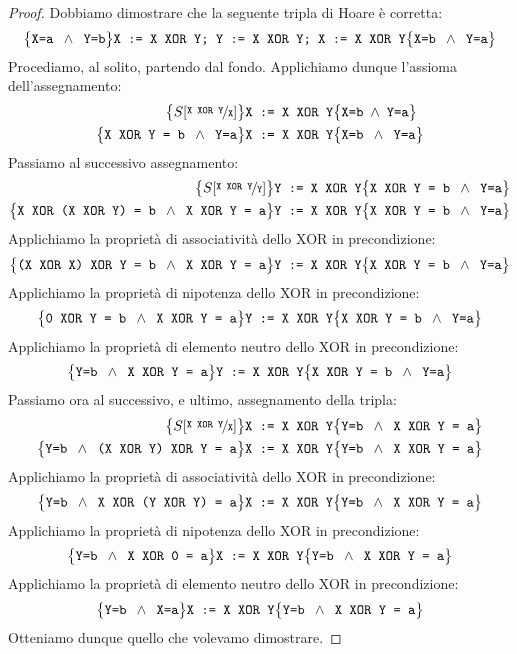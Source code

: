 \begin{proof}
Dobbiamo dimostrare che la seguente tripla di Hoare è corretta:
\[
  \bigl\{ \text{\texttt{X=a }} \land \text{\texttt{ Y=b}} \bigr\} 
  \text{\texttt{X := X XOR Y; Y := X XOR Y; X := X XOR Y}}
  \bigl\{\text{\texttt{X=b }} \land \text{\texttt{ Y=a}} \bigr\}
\]
Procediamo, al solito, partendo dal fondo. Applichiamo dunque l'assioma dell'assegnamento:
\begin{align*}
  \bigl\{ S[\nicefrac{\text{\texttt{X XOR Y}}}{\text{\texttt{X}}}] \bigr\} &
  \text{\texttt{X := X XOR Y}}
  \bigl\{\text{\texttt{X=b}} \; \land \; \text{\texttt{Y=a}} \bigr\} 
  \\
  \bigl\{\text{\texttt{X XOR Y = b }} \land \text{\texttt{ Y=a}}  \bigr\} &
  \text{\texttt{X := X XOR Y}}
  \bigl\{\text{\texttt{X=b }} \land \text{\texttt{ Y=a}} \bigr\}
\end{align*}
Passiamo al successivo assegnamento:
\begin{align*}
  \bigl\{ S[\nicefrac{\text{\texttt{X XOR Y}}}{\text{\texttt{Y}}} ] \bigr\} &
  \text{\texttt{Y := X XOR Y}}
  \bigl\{\text{\texttt{X XOR Y = b }} \land \text{\texttt{ Y=a}} \bigr\}
  \\
  \bigl\{ \text{\texttt{X XOR (X XOR Y) = b }} \land \text{\texttt{ X XOR Y = a}} \bigr\} &
  \text{\texttt{Y := X XOR Y}}
  \bigl\{ \text{\texttt{X XOR Y = b }} \land \text{\texttt{ Y=a}} \bigr\}
\end{align*}
Applichiamo la proprietà di associatività dello XOR in precondizione:
\[
  \bigl\{ \text{\texttt{(X XOR X) XOR Y = b }} \land \text{\texttt{ X XOR Y = a}} \bigr\}
  \texttt{Y := X XOR Y}
  \bigl\{ \text{\texttt{X XOR Y = b }} \land \text{\texttt{ Y=a}} \bigr\}
\]
Applichiamo la proprietà di nipotenza dello XOR in precondizione:
\[
  \bigl\{ \text{\texttt{0 XOR Y = b }} \land \text{\texttt{ X XOR Y = a}} \bigr\}
  \text{\texttt{Y := X XOR Y}}
  \bigl\{ \text{\texttt{X XOR Y = b }} \land \text{\texttt{ Y=a}} \bigr\}
\]
Applichiamo la proprietà di elemento neutro dello XOR in precondizione:
\[
  \bigl\{ \text{\texttt{Y=b }} \land \text{\texttt{ X XOR Y = a}} \bigr\}
  \text{\texttt{Y := X XOR Y}}
  \bigl\{ \text{\texttt{X XOR Y = b }} \land \text{\texttt{ Y=a}} \bigr\}
\]
Passiamo ora al successivo, e ultimo, assegnamento della tripla:
\begin{align*}
  \bigl\{ S[\nicefrac{\text{\texttt{X XOR Y}}}{\text{\texttt{X}}} ] \bigr\} &
  \text{\texttt{X := X XOR Y}}
  \bigl\{ \text{\texttt{Y=b }} \land \text{\texttt{ X XOR Y = a}} \bigr\}
  \\
 \bigl\{ \text{\texttt{Y=b }} \land \text{\texttt{ (X XOR Y) XOR Y = a}} \bigr\} &
  \text{\texttt{X := X XOR Y}}
  \bigl\{ \text{\texttt{Y=b }} \land \text{\texttt{ X XOR Y = a}} \bigr\}
\end{align*}
Applichiamo la proprietà di associatività dello XOR in precondizione:
\[
  \bigl\{ \text{\texttt{Y=b }} \land \text{\texttt{ X XOR (Y XOR Y) = a}} \bigr\}
  \text{\texttt{X := X XOR Y}}
  \bigl\{ \text{\texttt{Y=b }} \land \text{\texttt{ X XOR Y = a}} \bigr\}
\]
Applichiamo la proprietà di nipotenza dello XOR in precondizione:
\[
  \bigl\{ \text{\texttt{Y=b }} \land \text{\texttt{ X XOR 0 = a}} \bigr\}
  \texttt{X := X XOR Y}
  \bigl\{ \text{\texttt{Y=b }} \land \text{\texttt{ X XOR Y = a}} \bigr\}
\]
Applichiamo la proprietà di elemento neutro dello XOR in precondizione:
\[
  \bigl\{ \text{\texttt{Y=b }} \land \text{\texttt{ X=a}} \bigr\}
  \texttt{X := X XOR Y}
  \bigl\{ \text{\texttt{Y=b }} \land \text{\texttt{ X XOR Y = a}} \bigr\}
\]
Otteniamo dunque quello che volevamo dimostrare.
\end{proof}


